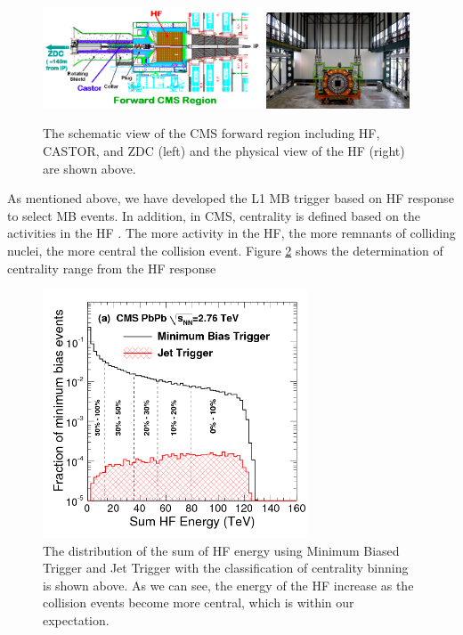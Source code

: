 \begin{figure}[hbtp]
\begin{center}
\includegraphics[width=0.58\textwidth]{Figures/Chapter3/CMSForwardRegion.png}
\includegraphics[width=0.38\textwidth]{Figures/Chapter3/HFReal.jpg}
\caption{The schematic view of the CMS forward region including HF, CASTOR, and ZDC (left) and the physical view of the HF (right) are shown above.}
\label{HFPic}
\end{center}
\end{figure} 

As mentioned above, we have developed the L1 MB trigger based on HF response to select MB events. In addition, in CMS, centrality is defined based on the activities in the HF \cite{HFCentRef}. The more activity in the HF, the more remnants of colliding nuclei, the more central the collision event. Figure \ref{HFCent} shows the determination of centrality range from the HF response 



\begin{figure}[hbtp]
\begin{center}
\includegraphics[width=0.70\textwidth]{Figures/Chapter3/HFCent.png}
\caption{The distribution of the sum of HF energy using Minimum Biased Trigger and Jet Trigger with the classification of centrality binning is shown above. As we can see, the energy of the HF increase as the collision events become more central, which  is within our expectation.}
\label{HFCent}
\end{center}
\end{figure} 



